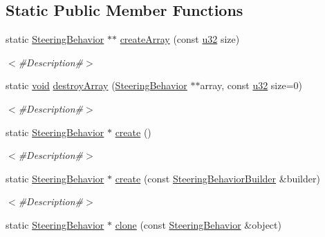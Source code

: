 \subsection*{Static Public Member Functions}
\begin{DoxyCompactItemize}
\item 
static \mbox{\hyperlink{classnjli_1_1_steering_behavior}{Steering\+Behavior}} $\ast$$\ast$ \mbox{\hyperlink{classnjli_1_1_steering_behavior_ac77f8ca5cacd612bc9de8e84c498df8d}{create\+Array}} (const \mbox{\hyperlink{_util_8h_a10e94b422ef0c20dcdec20d31a1f5049}{u32}} size)
\begin{DoxyCompactList}\small\item\em $<$\#\+Description\#$>$ \end{DoxyCompactList}\item 
static \mbox{\hyperlink{_thread_8h_af1e856da2e658414cb2456cb6f7ebc66}{void}} \mbox{\hyperlink{classnjli_1_1_steering_behavior_aa24a3dcd73261a34b1bbb80804a97425}{destroy\+Array}} (\mbox{\hyperlink{classnjli_1_1_steering_behavior}{Steering\+Behavior}} $\ast$$\ast$array, const \mbox{\hyperlink{_util_8h_a10e94b422ef0c20dcdec20d31a1f5049}{u32}} size=0)
\begin{DoxyCompactList}\small\item\em $<$\#\+Description\#$>$ \end{DoxyCompactList}\item 
static \mbox{\hyperlink{classnjli_1_1_steering_behavior}{Steering\+Behavior}} $\ast$ \mbox{\hyperlink{classnjli_1_1_steering_behavior_a41c2781070017d2faf5cd5bdabb36d09}{create}} ()
\begin{DoxyCompactList}\small\item\em $<$\#\+Description\#$>$ \end{DoxyCompactList}\item 
static \mbox{\hyperlink{classnjli_1_1_steering_behavior}{Steering\+Behavior}} $\ast$ \mbox{\hyperlink{classnjli_1_1_steering_behavior_af58fefc1f70b9399aa6369fb19c1e0b6}{create}} (const \mbox{\hyperlink{classnjli_1_1_steering_behavior_builder}{Steering\+Behavior\+Builder}} \&builder)
\begin{DoxyCompactList}\small\item\em $<$\#\+Description\#$>$ \end{DoxyCompactList}\item 
static \mbox{\hyperlink{classnjli_1_1_steering_behavior}{Steering\+Behavior}} $\ast$ \mbox{\hyperlink{classnjli_1_1_steering_behavior_a4b924a53f5289df64d24b88340601394}{clone}} (const \mbox{\hyperlink{classnjli_1_1_steering_behavior}{Steering\+Behavior}} \&object)

\end{DoxyCompactItemize}
